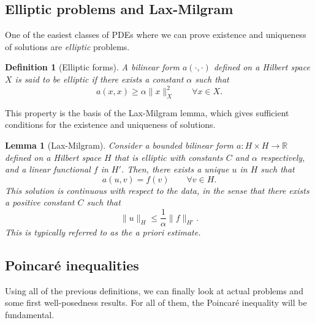 \documentclass{article}
\newtheorem{definition}{Definition}
\newcommand{\R}{\mathbb{R}}
\newtheorem{lemma}{Lemma}
\begin{document}
\subsection{Elliptic problems and Lax-Milgram}
One of the easiest classes of PDEs where we can prove existence and uniqueness of solutions are \textit{elliptic} problems. 
\begin{definition}[Elliptic forms]
    A bilinear form $a(\cdot, \cdot)$ defined on a Hilbert space $X$ is said to be elliptic if there exists a constant $\alpha$ such that
        $$ a(x, x) \geq \alpha \| x \|^2_X \qquad \forall x\in X. $$
\end{definition}
This property is the basis of the Lax-Milgram lemma, which gives sufficient conditions for the existence and uniqueness of solutions. 
\begin{lemma}[Lax-Milgram] Consider a bounded bilinear form $a: H\times H\to \R$ defined on a Hilbert space $H$ that is elliptic with constants $C$ and $\alpha$ respectively, and a linear functional $f$ in $H'$. Then, there exists a unique $u$ in $H$ such that 
    $$ a(u, v) = f(v) \qquad \forall v \in H. $$
This solution is continuous with respect to the data, in the sense that there exists a positive constant $C$ such that 
    $$ \| u\|_H \leq \frac 1 \alpha \| f \|_{H'} .$$
This is typically referred to as the \emph{a priori} estimate. 
\end{lemma}

\subsection{Poincaré inequalities}
Using all of the previous definitions, we can finally look at actual problems and some first well-posedness results. For all of them, the Poincaré inequality will be fundamental.
\end{document}

